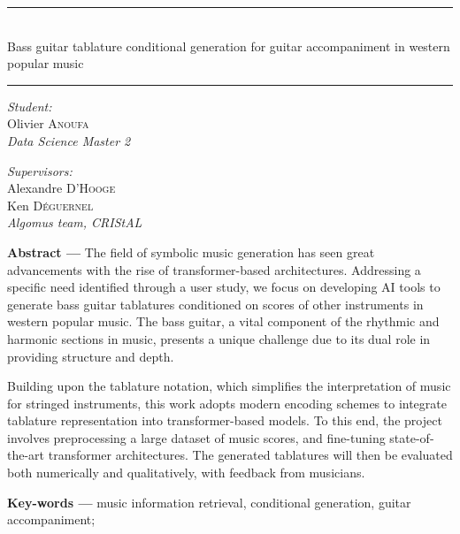\begin{titlepage}
\begin{minipage}{\linewidth}
\huge
\bfseries
\centering
\rule{\linewidth}{1.5pt}\\
Bass guitar tablature conditional generation for guitar accompaniment in western popular music\\[-3mm]
\rule{\linewidth}{1.5pt}
\end{minipage}

\vfill

\begin{minipage}{.45\linewidth}
\textit{Student:}\\
Olivier \textsc{Anoufa}\\
\textit{Data Science Master 2}

\end{minipage}
\hfill
\begin{minipage}{.45\linewidth}
\flushright
\textit{Supervisors:}\\
Alexandre \textsc{D'Hooge}\\
Ken \textsc{Déguernel}\\
\textit{Algomus team, CRIStAL}
\end{minipage}

\vfill

\begin{flushleft}
\justify
\textbf{Abstract ---} The field of symbolic music generation has seen great advancements with the rise of transformer-based architectures.
Addressing a specific need identified through a user study, we focus on developing AI tools to generate bass guitar tablatures conditioned on scores of other instruments in western popular music.
The bass guitar, a vital component of the rhythmic and harmonic sections in music, presents a unique challenge due to its dual role in providing structure and depth.


Building upon the tablature notation, which simplifies the interpretation of music for stringed instruments, this work adopts modern encoding schemes to integrate tablature representation into transformer-based models.
To this end, the project involves preprocessing a large dataset of music scores, and fine-tuning state-of-the-art transformer architectures.
The generated tablatures will then be evaluated both numerically and qualitatively, with feedback from musicians.
\vspace{.5\baselineskip}\\
\end{flushleft}
\vfill


\begin{flushleft}
\textbf{Key-words ---} music information retrieval, conditional generation, guitar accompaniment;
\vspace{.5\baselineskip}\\
\end{flushleft}
\vfill


\end{titlepage}
